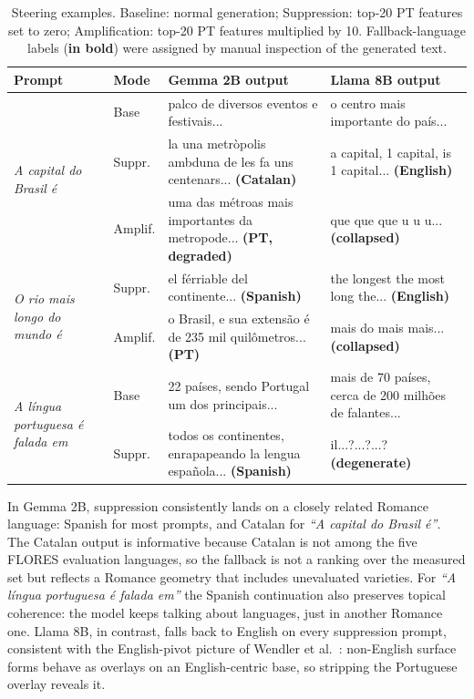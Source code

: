 \documentclass[runningheads]{llncs}
\begin{document}
\begin{table}[t]
\centering
\caption{Steering examples. Baseline: normal generation; Suppression: top-20 PT features set to zero; Amplification: top-20 PT features multiplied by 10. Fallback-language labels (\textbf{in bold}) were assigned by manual inspection of the generated text.}
\label{tab:steering}
\footnotesize
\begin{tabular}{p{2.0cm}lp{4.2cm}|p{4.2cm}}
\toprule
\textbf{Prompt} & \textbf{Mode} & \textbf{Gemma 2B output} & \textbf{Llama 8B output} \\
\midrule
\multirow{3}{2.0cm}{\raggedright\emph{A capital do Brasil \'e}} & Base & palco de diversos eventos e festivais... & o centro mais importante do pa\'is... \\
\cmidrule{2-4}
 & Suppr. & la una metr\`opolis ambduna de les fa uns centenars... \textbf{(Catalan)} & a capital, 1 capital, is 1 capital... \textbf{(English)} \\
\cmidrule{2-4}
 & Amplif. & uma das m\'etroas mais importantes da metropode... \textbf{(PT, degraded)} & que que que u u u... \mbox{\textbf{(collapsed)}} \\
\midrule
\multirow{2}{2.0cm}{\raggedright\emph{O rio mais longo do mundo \'e}} & Suppr. & el f\'erriable del continente... \textbf{(Spanish)} & the longest the most long the... \textbf{(English)} \\
\cmidrule{2-4}
 & Amplif. & o Brasil, e sua extens\~ao \'e de 235 mil quil\^ometros... \textbf{(PT)} & mais do mais mais... \mbox{\textbf{(collapsed)}} \\
\midrule
\multirow{2}{2.0cm}{\raggedright\emph{A l\'ingua portuguesa \'e falada em}} & Base & 22 pa\'ises, sendo Portugal um dos principais... & mais de 70 pa\'ises, cerca de 200 milh\~oes de falantes... \\
\cmidrule{2-4}
 & Suppr. & todos os continentes, enrapapeando la lengua espa\~nola... \textbf{(Spanish)} & il...?...?...? \textbf{(degenerate)} \\
\bottomrule
\end{tabular}
\end{table}

In Gemma 2B, suppression consistently lands on a closely related Romance language: Spanish for most prompts, and Catalan for \emph{``A capital do Brasil \'e''}. The Catalan output is informative because Catalan is not among the five FLORES evaluation languages, so the fallback is not a ranking over the measured set but reflects a Romance geometry that includes unevaluated varieties. For \emph{``A l\'ingua portuguesa \'e falada em''} the Spanish continuation also preserves topical coherence: the model keeps talking about languages, just in another Romance one. Llama 8B, in contrast, falls back to English on every suppression prompt, consistent with the English-pivot picture of Wendler et al.~\cite{wendler2024llamas}: non-English surface forms behave as overlays on an English-centric base, so stripping the Portuguese overlay reveals it.
\end{document}
